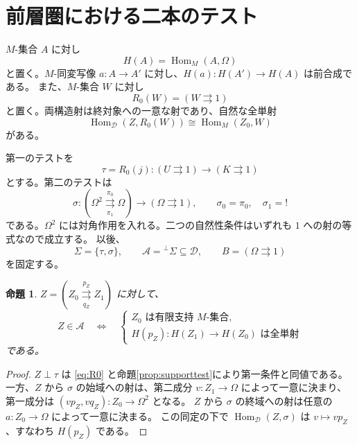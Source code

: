 \documentclass[a4paper,11pt]{ltjsarticle}
\theoremstyle{japaneseplain}
\newtheorem{proposition}[theorem]{命題}
\newcommand{\D}{\mathcal D}
\newcommand{\A}{\mathcal A}
\newcommand{\Hom}{\operatorname{Hom}}
\newcommand{\pairarrows}[2]{\mathrel{\mathop{\rightrightarrows}\limits^{#1}_{#2}}}
\newcommand{\coorth}[1]{{}^{\perp}\!#1}
\begin{document}
\section{前層圏における二本のテスト}\label{sec:tests}

$M$-集合 $A$ に対し
\[
 H(A)=\Hom_M(A,\Omega)
\]
と置く。$M$-同変写像 $a:A\to A'$ に対し、$H(a):H(A')\to H(A)$ は前合成である。
また、$M$-集合 $W$ に対し
\[
 R_0(W)=(W\rightrightarrows1)
\]
と置く。両構造射は終対象への一意な射であり、自然な全単射
\begin{equation}\label{eq:R0}
 \Hom_{\D}(Z,R_0(W))\cong\Hom_M(Z_0,W)
\end{equation}
がある。

第一のテストを
\begin{equation}\label{eq:tau}
 \tau=R_0(j):(U\rightrightarrows1)\longrightarrow(K\rightrightarrows1)
\end{equation}
とする。第二のテストは
\begin{equation}\label{eq:sigma}
 \sigma:
 (\Omega^2\pairarrows{\pi_0}{\pi_1}\Omega)
 \longrightarrow
 (\Omega\rightrightarrows1),
 \qquad \sigma_0=\pi_0,\quad\sigma_1=!
\end{equation}
である。$\Omega^2$ には対角作用を入れる。二つの自然性条件はいずれも $1$ への射の等式なので成立する。
以後、
\begin{equation}\label{eq:fixeddata}
 \Sigma=\{\tau,\sigma\},\qquad
 \A=\coorth{\Sigma}\subseteq\D,\qquad
 B=(\Omega\rightrightarrows1)
\end{equation}
を固定する。

\begin{proposition}\label{prop:membership}
$Z=(Z_0\pairarrows{p_Z}{q_Z}Z_1)$ に対して、
\begin{equation}\label{eq:membership}
 Z\in\A\quad\Longleftrightarrow\quad
 \begin{cases}
 Z_0\text{ は有限支持 }M\text{-集合},\\
 H(p_Z):H(Z_1)\longrightarrow H(Z_0)\text{ は全単射}
 \end{cases}
\end{equation}
である。
\end{proposition}
\begin{proof}
$Z\perp\tau$ は \eqref{eq:R0} と命題\ref{prop:supporttest}により第一条件と同値である。
一方、$Z$ から $\sigma$ の始域への射は、第二成分 $v:Z_1\to\Omega$ によって一意に決まり、
第一成分は $(vp_Z,vq_Z):Z_0\to\Omega^2$ となる。
$Z$ から $\sigma$ の終域への射は任意の $a:Z_0\to\Omega$ によって一意に決まる。
この同定の下で $\Hom_{\D}(Z,\sigma)$ は $v\mapsto vp_Z$、すなわち $H(p_Z)$ である。
\end{proof}
\end{document}
